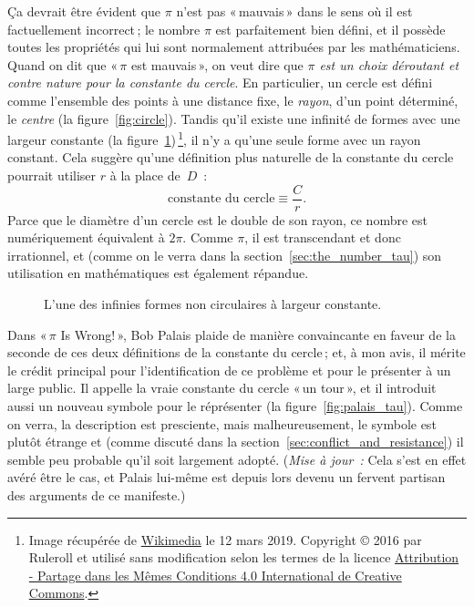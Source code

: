 Ça devrait être évident que $\pi$ n'est pas «\,mauvais\,» dans le sens où il est factuellement incorrect\,; le nombre $\pi$ est parfaitement bien défini, et il possède toutes les propriétés qui lui sont normalement attribuées par les mathématiciens. Quand on dit que «\,$\pi$ est mauvais\,», on veut dire que \emph{$\pi$ est un choix déroutant et contre nature pour la constante du cercle}. En particulier, un cercle est défini comme l'ensemble des points à une distance fixe, le \emph{rayon}, d'un point déterminé, le \emph{centre} (la figure~\ref{fig:circle}). Tandis qu'il existe une infinité de formes avec une largeur constante (la figure~\ref{fig:constant_width})\,\footnote{Image récupérée de \href{https://commons.wikimedia.org/wiki/File:Reuleaux_triangle_roll.gif}{Wikimedia} le 12 mars 2019. Copyright © 2016 par Ruleroll et utilisé sans modification selon les termes de la licence \href{https://creativecommons.org/licenses/by-sa/4.0/deed.fr}{Attribution - Partage dans les Mêmes Conditions 4.0 International de Creative Commons}.}, il n'y a qu'une seule forme avec un rayon constant. Cela suggère qu'une définition plus naturelle de la constante du cercle pourrait utiliser $r$ à la place de~$D$~:
\begin{equation}
\label{eq:circle_constant}
\mbox{constante du cercle} \equiv \frac{C}{r}.
\end{equation}
Parce que le diamètre d'un cercle est le double de son rayon, ce nombre est numériquement équivalent à $2\pi$. Comme $\pi$, il est transcendant et donc irrationnel, et (comme on le verra dans la section~\ref{sec:the_number_tau}) son utilisation en mathématiques est également répandue.

\begin{figure}
\caption{L'une des infinies formes non circulaires à largeur constante.\label{fig:constant_width}}
\end{figure}

Dans «\,$\pi$ Is Wrong!\,», Bob Palais plaide de manière convaincante en faveur de la seconde de ces deux définitions de la constante du cercle\,; et, à mon avis, il mérite le crédit principal pour l'identification de ce problème et pour le présenter à un large public. Il appelle la vraie constante du cercle «\,un tour\,», et il introduit aussi un nouveau symbole pour le réprésenter (la figure~\ref{fig:palais_tau}). Comme on verra, la description est presciente, mais malheureusement, le symbole est plutôt étrange et (comme discuté dans la section~\ref{sec:conflict_and_resistance}) il semble peu probable qu'il soit largement adopté. (\emph{Mise à jour~:} Cela s'est en effet avéré être le cas, et Palais lui-même est depuis lors devenu un fervent partisan des arguments de ce manifeste.)

